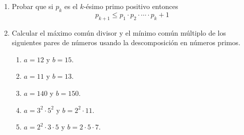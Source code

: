 \documentclass[a4paper,12pt,twoside,spanish,reqno]{amsbook}
\numberwithin{equation}{section}
\begin{document}
\begin{enumerate}
\item Probar que si $p_k$ es el $k$-ésimo primo positivo entonces
$$p_{k+1}\leq p_1\cdot p_2\cdot \cdots \cdot p_k+1$$



\item Calcular el máximo común divisor y el mínimo común múltiplo de los siguientes pares de números usando la descomposición en números primos. 
\begin{multicols}{3}
    \begin{enumerate}
        \item $a=12$ y $b=15$. 
        \item$a=11$ y $b=13$.
        \item $a=140$ y $b=150$.
        \item $a=3^2 \cdot 5^2$ y $b=2^2 \cdot 11$.
        \item $a=2^2 \cdot 3\cdot 5$ y $b=2\cdot 5\cdot 7$.
    \end{enumerate}
\end{multicols}


\end{enumerate}
\end{document}
